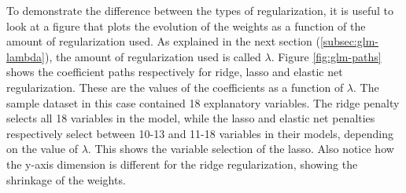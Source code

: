 To demonstrate the difference between the types of regularization, it is useful to look at a figure that plots the evolution of the weights as a function of the amount of regularization used. As explained in the next section (\ref{subsec:glm-lambda}), the amount of regularization used is called $\lambda$. Figure \ref{fig:glm-paths} shows the coefficient paths respectively for ridge, lasso and elastic net regularization. These are the values of the coefficients as a function of $\lambda$. The sample dataset in this case contained 18 explanatory variables. The ridge penalty selects all 18 variables in the model, while the lasso and elastic net penalties respectively select between 10-13 and 11-18 variables in their models, depending on the value of $\lambda$. This shows the variable selection of the lasso. Also notice how the y-axis dimension is different for the ridge regularization, showing the shrinkage of the weights.
